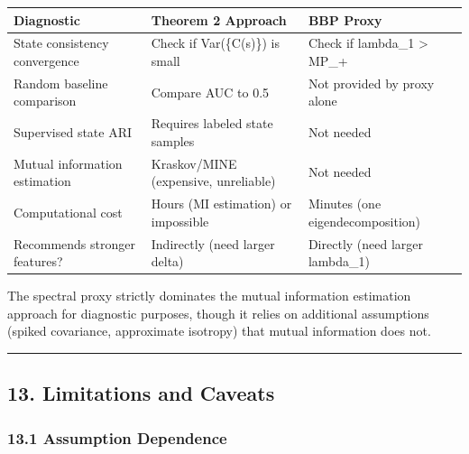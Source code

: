 \documentclass[
  12pt,
]{article}
\begin{document}
\begin{longtable}[]{@{}
  >{\raggedright\arraybackslash}p{}
  >{\raggedright\arraybackslash}p{}
  >{\raggedright\arraybackslash}p{}@{}}
\toprule\noalign{}
\begin{minipage}[b]{\linewidth}\raggedright
Diagnostic
\end{minipage} & \begin{minipage}[b]{\linewidth}\raggedright
Theorem 2 Approach
\end{minipage} & \begin{minipage}[b]{\linewidth}\raggedright
BBP Proxy
\end{minipage} \\
\midrule\noalign{}
\endhead
\bottomrule\noalign{}
\endlastfoot
State consistency convergence & Check if Var(\{C(s)\}) is small & Check
if lambda\_1 \textgreater{} MP\_+ \\
Random baseline comparison & Compare AUC to 0.5 & Not provided by proxy
alone \\
Supervised state ARI & Requires labeled state samples & Not needed \\
Mutual information estimation & Kraskov/MINE (expensive, unreliable) &
Not needed \\
Computational cost & Hours (MI estimation) or impossible & Minutes (one
eigendecomposition) \\
Recommends stronger features? & Indirectly (need larger delta) &
Directly (need larger lambda\_1) \\
\end{longtable}

The spectral proxy strictly dominates the mutual information estimation
approach for diagnostic purposes, though it relies on additional
assumptions (spiked covariance, approximate isotropy) that mutual
information does not.

\begin{center}\rule{0.5\linewidth}{0.5pt}\end{center}

\subsection{13. Limitations and Caveats}\label{limitations-and-caveats}

\subsubsection{13.1 Assumption Dependence}\label{assumption-dependence}
\end{document}
